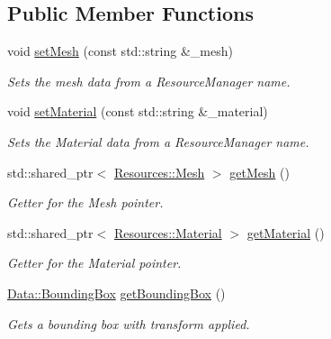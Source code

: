 \subsection*{Public Member Functions}
\begin{DoxyCompactItemize}
\item 
void \hyperlink{class_cookie_eng_1_1_components_1_1_renderable_a4b9903e0bfb81ec574d022d7b2c198af}{set\+Mesh} (const std\+::string \&\+\_\+mesh)
\begin{DoxyCompactList}\small\item\em Sets the mesh data from a Resource\+Manager name. \end{DoxyCompactList}\item 
void \hyperlink{class_cookie_eng_1_1_components_1_1_renderable_a5ea9d1153bbe51b264c20102f8c72db9}{set\+Material} (const std\+::string \&\+\_\+material)
\begin{DoxyCompactList}\small\item\em Sets the Material data from a Resource\+Manager name. \end{DoxyCompactList}\item 
std\+::shared\+\_\+ptr$<$ \hyperlink{struct_cookie_eng_1_1_resources_1_1_mesh}{Resources\+::\+Mesh} $>$ \hyperlink{class_cookie_eng_1_1_components_1_1_renderable_a37002e38b2ea9a39c31dc5d610ce827b}{get\+Mesh} ()
\begin{DoxyCompactList}\small\item\em Getter for the Mesh pointer. \end{DoxyCompactList}\item 
std\+::shared\+\_\+ptr$<$ \hyperlink{class_cookie_eng_1_1_resources_1_1_material}{Resources\+::\+Material} $>$ \hyperlink{class_cookie_eng_1_1_components_1_1_renderable_a578ffbbc5b4245ade613d0dcfa571413}{get\+Material} ()
\begin{DoxyCompactList}\small\item\em Getter for the Material pointer. \end{DoxyCompactList}\item 
\hyperlink{class_cookie_eng_1_1_data_1_1_bounding_box}{Data\+::\+Bounding\+Box} \hyperlink{class_cookie_eng_1_1_components_1_1_renderable_a4563f6482300ce4fa250188409a787f6}{get\+Bounding\+Box} ()
\begin{DoxyCompactList}\small\item\em Gets a bounding box with transform applied. \end{DoxyCompactList}\end{DoxyCompactItemize}
